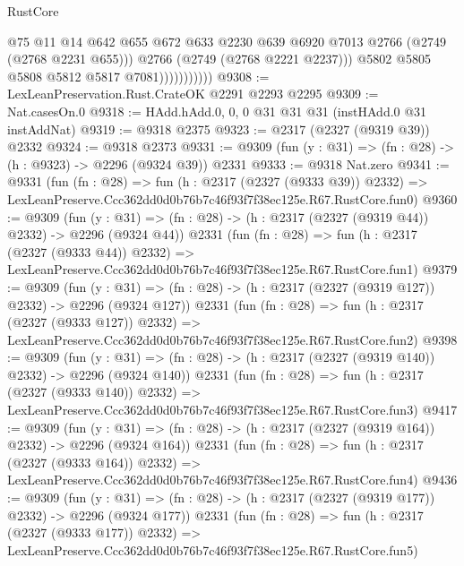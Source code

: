 \begin{lexlean}{RustCore}
\begin{coremodule}
                              @75
                              @11
                              @14
                              @642
                              @655
                              @672
                              @633
                              @2230
                              @639
                              @6920
                              @7013
                              @2766
                              (@2749 (@2768 @2231 @655)))
                            @2766
                            (@2749 (@2768 @2221 @2237)))
                          @5802
                          @5805
                          @5808
                          @5812
                          @5817
                          @7081)))))))))))
@9308 := LexLeanPreservation.Rust.CrateOK @2291 @2293 @2295
@9309 := Nat.casesOn.{0}
@9318 := HAdd.hAdd.{0, 0, 0} @31 @31 @31 (instHAdd.{0} @31 instAddNat)
@9319 := @9318 @2375
@9323 := @2317 (@2327 (@9319 @39)) @2332
@9324 := @9318 @2373
@9331 := @9309 (fun (y : @31) => (fn : @28) -> (h : @9323) -> @2296 (@9324 @39)) @2331
@9333 := @9318 Nat.zero
@9341 := @9331
    (fun (fn : @28) =>
    fun (h : @2317 (@2327 (@9333 @39)) @2332) =>
    LexLeanPreserve.Ccc362dd0d0b76b7c46f93f7f38ec125e.R67.RustCore.fun0)
@9360 := @9309
    (fun (y : @31) => (fn : @28) -> (h : @2317 (@2327 (@9319 @44)) @2332) -> @2296 (@9324 @44))
    @2331
    (fun (fn : @28) =>
    fun (h : @2317 (@2327 (@9333 @44)) @2332) =>
    LexLeanPreserve.Ccc362dd0d0b76b7c46f93f7f38ec125e.R67.RustCore.fun1)
@9379 := @9309
    (fun (y : @31) => (fn : @28) -> (h : @2317 (@2327 (@9319 @127)) @2332) -> @2296 (@9324 @127))
    @2331
    (fun (fn : @28) =>
    fun (h : @2317 (@2327 (@9333 @127)) @2332) =>
    LexLeanPreserve.Ccc362dd0d0b76b7c46f93f7f38ec125e.R67.RustCore.fun2)
@9398 := @9309
    (fun (y : @31) => (fn : @28) -> (h : @2317 (@2327 (@9319 @140)) @2332) -> @2296 (@9324 @140))
    @2331
    (fun (fn : @28) =>
    fun (h : @2317 (@2327 (@9333 @140)) @2332) =>
    LexLeanPreserve.Ccc362dd0d0b76b7c46f93f7f38ec125e.R67.RustCore.fun3)
@9417 := @9309
    (fun (y : @31) => (fn : @28) -> (h : @2317 (@2327 (@9319 @164)) @2332) -> @2296 (@9324 @164))
    @2331
    (fun (fn : @28) =>
    fun (h : @2317 (@2327 (@9333 @164)) @2332) =>
    LexLeanPreserve.Ccc362dd0d0b76b7c46f93f7f38ec125e.R67.RustCore.fun4)
@9436 := @9309
    (fun (y : @31) => (fn : @28) -> (h : @2317 (@2327 (@9319 @177)) @2332) -> @2296 (@9324 @177))
    @2331
    (fun (fn : @28) =>
    fun (h : @2317 (@2327 (@9333 @177)) @2332) =>
    LexLeanPreserve.Ccc362dd0d0b76b7c46f93f7f38ec125e.R67.RustCore.fun5)

\end{coremodule}
\end{lexlean}
